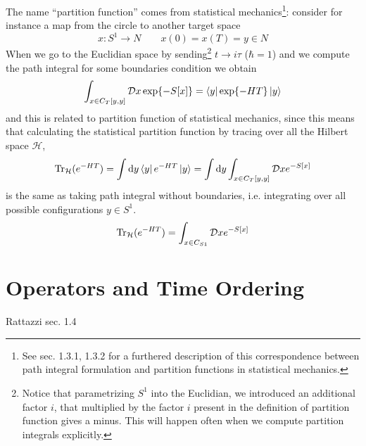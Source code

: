 \documentclass[../main/main.tex]{subfiles}
\begin{document}
The name ``partition function'' comes from statistical mechanics\footnote{See \cite{Nakahara:2003aa} sec. 1.3.1, 1.3.2 for a furthered description of this correspondence between path integral formulation and partition functions in statistical mechanics.}: consider for instance a map from the circle to another target space
\[x:S^1\to N\qquad x(0)=x(T)=y\in N\]
When we go to the Euclidian space by sending\footnote{Notice that parametrizing $S^1$ into the Euclidian, we introduced an additional factor $i$, that multiplied by the factor $i$ present in the definition of partition function gives a minus. This will happen often when we compute partition integrals explicitly.} $t\to i\tau$ ($\hbar =1$) and we compute the path integral for some boundaries condition we obtain
\[\int_{x\in C_T[y,y]}\mathcal Dx \exp{-S[x]}=\bra{y}\exp{-HT}\ket {y}\]
and this is related to partition function of statistical mechanics, since this means that calculating the statistical partition function by tracing over all the Hilbert space $\mathcal H$,
\[\Tr_{\mathcal H}(e^{-HT})=\int \textup{d} y\bra{y}e^{-HT}\ket{y}=\int\textup{d} y\int_{x\in C_T[y,y]}\mathcal D xe^{-S[x]}\]
is the same as taking path integral without boundaries, i.e. integrating over all possible configurations $y\in S^1$. 
\[\Tr_{\mathcal H}(e^{-HT})=\int_{x\in C_{S1}}\mathcal Dxe^{-S[x]}\]


\section{Operators and Time Ordering}
\textsf{Rattazzi sec. 1.4}\\
\end{document}
